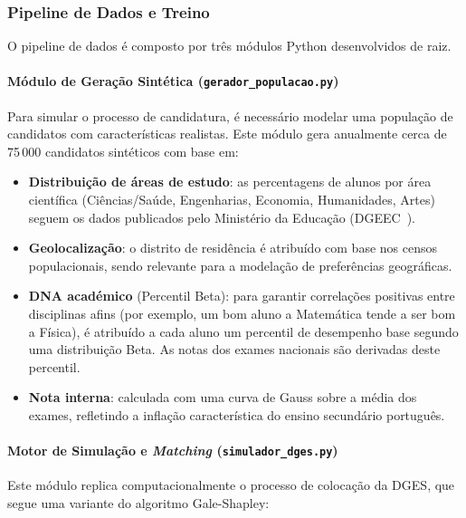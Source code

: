 \documentclass[12pt,a4paper]{article}
\begin{document}
\subsubsection{Pipeline de Dados e Treino}

O pipeline de dados é composto por três módulos Python desenvolvidos de raiz.

\paragraph{Módulo de Geração Sintética (\texttt{gerador\_populacao.py})}

Para simular o processo de candidatura, é necessário modelar uma população de candidatos com características realistas. Este módulo gera anualmente cerca de 75\,000 candidatos sintéticos com base em:

\begin{itemize}[noitemsep]
  \item \textbf{Distribuição de áreas de estudo}: as percentagens de alunos por área científica (Ciências/Saúde, Engenharias, Economia, Humanidades, Artes) seguem os dados publicados pelo Ministério da Educação (DGEEC~\cite{dgeec}).
  \item \textbf{Geolocalização}: o distrito de residência é atribuído com base nos censos populacionais, sendo relevante para a modelação de preferências geográficas.
  \item \textbf{DNA académico} (Percentil Beta): para garantir correlações positivas entre disciplinas afins (por exemplo, um bom aluno a Matemática tende a ser bom a Física), é atribuído a cada aluno um percentil de desempenho base segundo uma distribuição Beta. As notas dos exames nacionais são derivadas deste percentil.
  \item \textbf{Nota interna}: calculada com uma curva de Gauss sobre a média dos exames, refletindo a inflação característica do ensino secundário português.
\end{itemize}

\paragraph{Motor de Simulação e \textit{Matching} (\texttt{simulador\_dges.py})}

Este módulo replica computacionalmente o processo de colocação da DGES, que segue uma variante do algoritmo Gale-Shapley:
\end{document}
